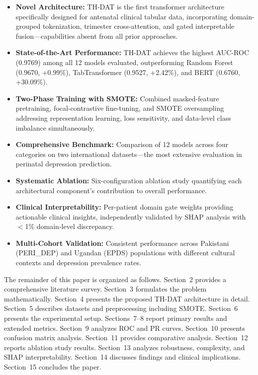 \documentclass[12pt,a4paper]{article}
\begin{document}
\begin{itemize}
    \item \textbf{Novel Architecture:} TH-DAT is the first transformer architecture specifically designed for antenatal clinical tabular data, incorporating domain-grouped tokenization, trimester cross-attention, and gated interpretable fusion---capabilities absent from all prior approaches.
    \item \textbf{State-of-the-Art Performance:} TH-DAT achieves the highest AUC-ROC (0.9769) among all 12 models evaluated, outperforming Random Forest (0.9670, +0.99\%), TabTransformer (0.9527, +2.42\%), and BERT (0.6760, +30.09\%).
    \item \textbf{Two-Phase Training with SMOTE:} Combined masked-feature pretraining, focal-contrastive fine-tuning, and SMOTE oversampling addressing representation learning, loss sensitivity, and data-level class imbalance simultaneously.
    \item \textbf{Comprehensive Benchmark:} Comparison of 12 models across four categories on two international datasets---the most extensive evaluation in perinatal depression prediction.
    \item \textbf{Systematic Ablation:} Six-configuration ablation study quantifying each architectural component's contribution to overall performance.
    \item \textbf{Clinical Interpretability:} Per-patient domain gate weights providing actionable clinical insights, independently validated by SHAP analysis with $<$1\% domain-level discrepancy.
    \item \textbf{Multi-Cohort Validation:} Consistent performance across Pakistani (PERI\_DEP) and Ugandan (EPDS) populations with different cultural contexts and depression prevalence rates.
\end{itemize}

The remainder of this paper is organized as follows. Section~2 provides a comprehensive literature survey. Section~3 formulates the problem mathematically. Section~4 presents the proposed TH-DAT architecture in detail. Section~5 describes datasets and preprocessing including SMOTE. Section~6 presents the experimental setup. Sections~7--8 report primary results and extended metrics. Section~9 analyzes ROC and PR curves. Section~10 presents confusion matrix analysis. Section~11 provides comparative analysis. Section~12 reports ablation study results. Section~13 analyzes robustness, complexity, and SHAP interpretability. Section~14 discusses findings and clinical implications. Section~15 concludes the paper.
\end{document}
